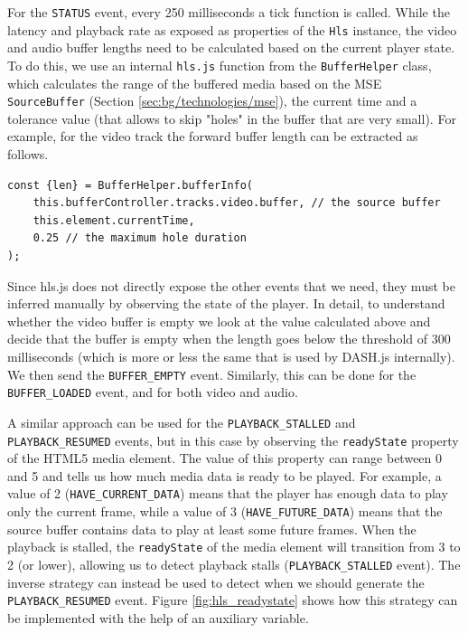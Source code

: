 For the \texttt{STATUS} event, every 250 milliseconds a tick function is called. While the latency and playback rate as exposed as properties of the \texttt{Hls} instance, the video and audio buffer lengths need to be calculated based on the current player state. To do this, we use an internal \texttt{hls.js} function from the \texttt{BufferHelper} class, which calculates the range of the buffered media based on the MSE \texttt{SourceBuffer} (Section \ref{sec:bg/technologies/mse}), the current time and a tolerance value (that allows to skip "holes" in the buffer that are very small). For example, for the video track the forward buffer length can be extracted as follows.

\begin{verbatim}
const {len} = BufferHelper.bufferInfo(
    this.bufferController.tracks.video.buffer, // the source buffer
    this.element.currentTime,
    0.25 // the maximum hole duration
);
\end{verbatim}

Since hls.js does not directly expose the other events that we need, they must be inferred manually by observing the state of the player. In detail, to understand whether the video buffer is empty we look at the value calculated above and decide that the buffer is empty when the length goes below the threshold of 300 milliseconds (which is more or less the same that is used by DASH.js internally). We then send the \texttt{BUFFER\_EMPTY} event. Similarly, this can be done for the \texttt{BUFFER\_LOADED} event, and for both video and audio.

A similar approach can be used for the \texttt{PLAYBACK\_STALLED} and \texttt{PLAYBACK\_RESUMED} events, but in this case by observing the \texttt{readyState} property of the HTML5 media element. The value of this property can range between 0 and 5 and tells us how much media data is ready to be played. For example, a value of 2 (\texttt{HAVE\_CURRENT\_DATA}) means that the player has enough data to play only the current frame, while a value of 3 (\texttt{HAVE\_FUTURE\_DATA}) means that the source buffer contains data to play at least some future frames. When the playback is stalled, the \texttt{readyState} of the media element will transition from 3 to 2 (or lower), allowing us to detect playback stalls (\texttt{PLAYBACK\_STALLED} event). The inverse strategy can instead be used to detect when we should generate the \texttt{PLAYBACK\_RESUMED} event. Figure \ref{fig:hls_readystate} shows how this strategy can be implemented with the help of an auxiliary variable.

